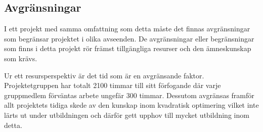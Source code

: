 \subsection{Avgränsningar}
I ett projekt med samma omfattning som detta måste det finnas avgränsningar som begränsar projektet i olika avseenden. De avgränsningar eller begränsningar som finns i detta projekt rör främst tillgängliga resurser och den ämneskunskap som krävs.

Ur ett resursperspektiv är det tid som är en avgränsande faktor. Projektetgruppen har totalt 2100 timmar till sitt förfogande där varje gruppmedlem förväntas arbete ungefär 300 timmar. Dessutom avgränsas framför allt projektets tidiga skede av den kunskap inom kvadratisk optimering vilket inte lärts ut under utbildningen och därför gett upphov till mycket utbildning inom detta.